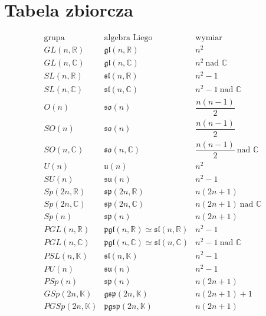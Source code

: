 \section{Tabela zbiorcza}

\[
\begin{array}{c|c|c}
\text{grupa}
&
\text{algebra Liego}
&
\text{wymiar}
\\
\hline

GL(n,\mathbb R)
&
\mathfrak{gl}(n,\mathbb R)
&
n^2
\\[1mm]

GL(n,\mathbb C)
&
\mathfrak{gl}(n,\mathbb C)
&
n^2\ \text{nad }\mathbb C
\\[1mm]

SL(n,\mathbb R)
&
\mathfrak{sl}(n,\mathbb R)
&
n^2-1
\\[1mm]

SL(n,\mathbb C)
&
\mathfrak{sl}(n,\mathbb C)
&
n^2-1\ \text{nad }\mathbb C
\\[1mm]

O(n)
&
\mathfrak{so}(n)
&
\dfrac{n(n-1)}2
\\[3mm]

SO(n)
&
\mathfrak{so}(n)
&
\dfrac{n(n-1)}2
\\[3mm]

SO(n,\mathbb C)
&
\mathfrak{so}(n,\mathbb C)
&
\dfrac{n(n-1)}2\ \text{nad }\mathbb C
\\[3mm]

U(n)
&
\mathfrak u(n)
&
n^2
\\[1mm]

SU(n)
&
\mathfrak{su}(n)
&
n^2-1
\\[1mm]

Sp(2n,\mathbb R)
&
\mathfrak{sp}(2n,\mathbb R)
&
n(2n+1)
\\[1mm]

Sp(2n,\mathbb C)
&
\mathfrak{sp}(2n,\mathbb C)
&
n(2n+1)\ \text{nad }\mathbb C
\\[1mm]

Sp(n)
&
\mathfrak{sp}(n)
&
n(2n+1)
\\[1mm]

PGL(n,\mathbb R)
&
\mathfrak{pgl}(n,\mathbb R)
\simeq
\mathfrak{sl}(n,\mathbb R)
&
n^2-1
\\[1mm]

PGL(n,\mathbb C)
&
\mathfrak{pgl}(n,\mathbb C)
\simeq
\mathfrak{sl}(n,\mathbb C)
&
n^2-1\ \text{nad }\mathbb C
\\[1mm]

PSL(n,\mathbb K)
&
\mathfrak{sl}(n,\mathbb K)
&
n^2-1
\\[1mm]

PU(n)
&
\mathfrak{su}(n)
&
n^2-1
\\[1mm]

PSp(n)
&
\mathfrak{sp}(n)
&
n(2n+1)
\\[1mm]

GSp(2n,\mathbb K)
&
\mathfrak{gsp}(2n,\mathbb K)
&
n(2n+1)+1
\\[1mm]

PGSp(2n,\mathbb K)
&
\mathfrak{pgsp}(2n,\mathbb K)
&
n(2n+1)
\end{array}
\]

